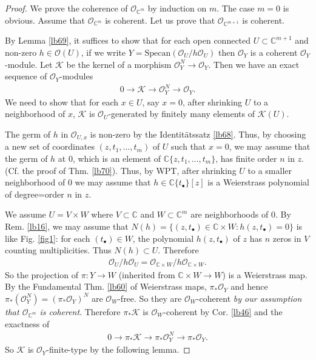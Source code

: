 \documentclass[12pt,b5paper,notitlepage]{report}
\theoremstyle{definition}
\theoremstyle{plain}
\newcommand{\scr}{\mathscr}
\newcommand{\blt}{\bullet}
\newcommand{\Cbb}{\mathbb C}
\newcommand{\Specan}{\mathrm{Specan}}
\numberwithin{equation}{section}
\begin{document}
\begin{proof}
We prove the coherence of $\scr O_{\Cbb^m}$ by induction on $m$. The case $m=0$ is obvious. Assume that $\scr O_{\Cbb^m}$ is coherent. Let us prove that $\scr O_{\Cbb^{m+1}}$ is coherent.

By Lemma \ref{lb69}, it suffices to show that for each open connected $U\subset \Cbb^{m+1}$ and non-zero $h\in\scr O(U)$, if we write $Y=\Specan(\scr O_U/h\scr O_U)$ then $\scr O_Y$ is a coherent $\scr O_Y$-module. Let $\scr K$ be the kernel of a morphism $\scr O_Y^N\rightarrow\scr O_Y$. Then we have an exact sequence of $\scr O_Y$-modules
\begin{align*}
0\rightarrow\scr K\rightarrow\scr O_Y^N\rightarrow\scr O_Y.
\end{align*}
We need to show that for each $x\in U$, say $x=0$, after shrinking $U$ to a neighborhood of $x$, $\scr K$ is $\scr O_U$-generated by finitely many elements of $\scr K(U)$.

The germ of $h$ in $\scr O_{U,x}$ is non-zero by the Identit\"atssatz \ref{lb68}. Thus, by choosing a new set of coordinates $(z,t_1,\dots,t_m)$ of $U$ such that $x=0$, we may assume that the germ of $h$ at $0$, which is an element of $\Cbb\{z,t_1,\dots,t_m\}$, has finite order $n$ in $z$. (Cf. the proof of Thm. \ref{lb70}). Thus, by WPT, after shrinking $U$ to a smaller neighborhood of $0$ we may assume that $h\in\Cbb\{t_\blt\}[z]$ is a Weierstrass polynomial of degree=order $n$ in $z$.

We assume $U=V\times W$ where $V\subset\Cbb$ and $W\subset\Cbb^m$ are neighborhoods of $0$. By Rem. \ref{lb16}, we may assume that $N(h)=\{(z,t_\blt)\in\Cbb\times W:h(z,t_\blt)=0\}$ is like Fig. \ref{fig1}: for each $(t_\blt)\in W$, the polynomial $h(z,t_\blt)$ of $z$ has $n$ zeros in $V$ counting multiplicities. Thus $N(h)\subset U$. Therefore
\begin{align*}
\scr O_U/h\scr O_U=\scr O_{\Cbb\times W}/h\scr O_{\Cbb\times W}.
\end{align*}
So the projection of $\pi:Y\rightarrow W$ (inherited from $\Cbb\times W\rightarrow W$) is a Weierstrass map. By the Fundamental Thm. \ref{lb60} of Weierstrass maps, $\pi_*\scr O_Y$ and hence $\pi_*(\scr O_Y^N)=(\pi_*\scr O_Y)^N$ are $\scr O_W$-free. So they are $\scr O_W$-coherent \emph{by our assumption that $\scr O_{\Cbb^m}$ is coherent}.  Therefore $\pi_*\scr K$ is $\scr O_W$-coherent by Cor. \ref{lb46} and the exactness of
\begin{align*}
0\rightarrow\pi_*\scr K\rightarrow \pi_*\scr O_Y^N\rightarrow\pi_*\scr O_Y.
\end{align*}
So $\scr K$ is $\scr O_Y$-finite-type by the following lemma.
\end{proof}
\end{document}
